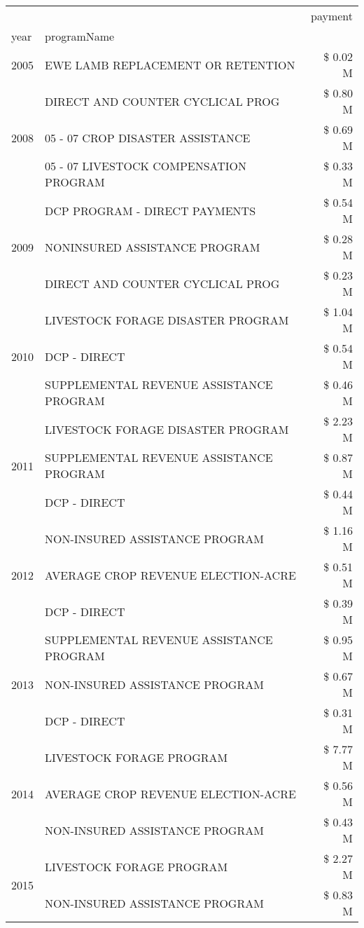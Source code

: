 \begin{tabular}{llr}
\toprule
 &  & payment \\
year & programName &  \\
\midrule
2005 & EWE LAMB REPLACEMENT OR RETENTION & \$ 0.02 M \\
\cline{1-3}
\multirow[t]{3}{*}{2008} & DIRECT AND COUNTER CYCLICAL PROG & \$ 0.80 M \\
 & 05 - 07 CROP DISASTER ASSISTANCE & \$ 0.69 M \\
 & 05 - 07 LIVESTOCK COMPENSATION PROGRAM & \$ 0.33 M \\
\cline{1-3}
\multirow[t]{3}{*}{2009} & DCP PROGRAM - DIRECT PAYMENTS & \$ 0.54 M \\
 & NONINSURED ASSISTANCE PROGRAM & \$ 0.28 M \\
 & DIRECT AND COUNTER CYCLICAL PROG & \$ 0.23 M \\
\cline{1-3}
\multirow[t]{3}{*}{2010} & LIVESTOCK FORAGE DISASTER PROGRAM & \$ 1.04 M \\
 & DCP - DIRECT & \$ 0.54 M \\
 & SUPPLEMENTAL REVENUE ASSISTANCE PROGRAM & \$ 0.46 M \\
\cline{1-3}
\multirow[t]{3}{*}{2011} & LIVESTOCK FORAGE DISASTER PROGRAM & \$ 2.23 M \\
 & SUPPLEMENTAL REVENUE ASSISTANCE PROGRAM & \$ 0.87 M \\
 & DCP - DIRECT & \$ 0.44 M \\
\cline{1-3}
\multirow[t]{3}{*}{2012} & NON-INSURED ASSISTANCE PROGRAM & \$ 1.16 M \\
 & AVERAGE CROP REVENUE ELECTION-ACRE & \$ 0.51 M \\
 & DCP - DIRECT & \$ 0.39 M \\
\cline{1-3}
\multirow[t]{3}{*}{2013} & SUPPLEMENTAL REVENUE ASSISTANCE PROGRAM & \$ 0.95 M \\
 & NON-INSURED ASSISTANCE PROGRAM & \$ 0.67 M \\
 & DCP - DIRECT & \$ 0.31 M \\
\cline{1-3}
\multirow[t]{3}{*}{2014} & LIVESTOCK FORAGE PROGRAM & \$ 7.77 M \\
 & AVERAGE CROP REVENUE ELECTION-ACRE & \$ 0.56 M \\
 & NON-INSURED ASSISTANCE PROGRAM & \$ 0.43 M \\
\cline{1-3}
\multirow[t]{3}{*}{2015} & LIVESTOCK FORAGE PROGRAM & \$ 2.27 M \\
 & NON-INSURED ASSISTANCE PROGRAM & \$ 0.83 M \\

\end{tabular}
